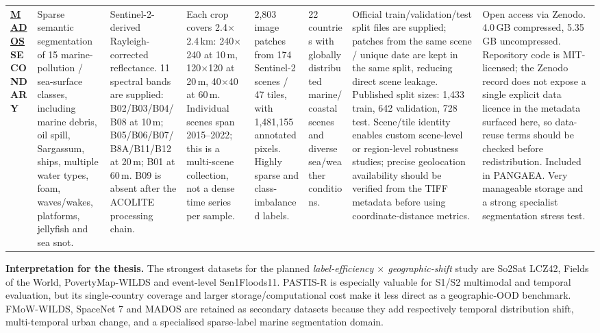 \begin{landscape}
\begin{longtable}{
    Q{1.8cm}
    Q{2.5cm}
    Q{3.0cm}
    Q{2.5cm}
    Q{2.1cm}
    Q{3.0cm}
    Q{3.4cm}
    Q{3.4cm}
}
\href{https://zenodo.org/records/10664073}{\textbf{MADOS}}\newline
\textbf{SECONDARY}
&
Sparse semantic segmentation of 15 marine-pollution / sea-surface classes, including marine debris, oil spill, Sargassum, ships, multiple water types, foam, waves/wakes, platforms, jellyfish and sea snot.
&
Sentinel-2-derived Rayleigh-corrected reflectance. 11 spectral bands are supplied: B02/B03/B04/B08 at 10\,m; B05/B06/B07/B8A/B11/B12 at 20\,m; B01 at 60\,m. B09 is absent after the ACOLITE processing chain.
&
Each crop covers 2.4$\times$2.4\,km: 240$\times$240 at 10\,m, 120$\times$120 at 20\,m, 40$\times$40 at 60\,m. Individual scenes span 2015--2022; this is a multi-scene collection, not a dense time series per sample.
&
2,803 image patches from 174 Sentinel-2 scenes / 47 tiles, with 1,481,155 annotated pixels. Highly sparse and class-imbalanced labels.
&
22 countries with globally distributed marine/coastal scenes and diverse sea/weather conditions.
&
Official train/validation/test split files are supplied; patches from the same scene / unique date are kept in the same split, reducing direct scene leakage. Published split sizes: 1,433 train, 642 validation, 728 test. Scene/tile identity enables custom scene-level or region-level robustness studies; precise geolocation availability should be verified from the TIFF metadata before using coordinate-distance metrics.
&
Open access via Zenodo. 4.0\,GB compressed, 5.35\,GB uncompressed. Repository code is MIT-licensed; the Zenodo record does not expose a single explicit data licence in the metadata surfaced here, so data-reuse terms should be checked before redistribution. Included in PANGAEA. Very manageable storage and a strong specialist segmentation stress test.
\\

\end{longtable}

\vspace{0.5em}
\footnotesize
\noindent\textbf{Interpretation for the thesis.}
The strongest datasets for the planned \emph{label-efficiency $\times$ geographic-shift} study are So2Sat LCZ42, Fields of the World, PovertyMap-WILDS and event-level Sen1Floods11. PASTIS-R is especially valuable for S1/S2 multimodal and temporal evaluation, but its single-country coverage and larger storage/computational cost make it less direct as a geographic-OOD benchmark. FMoW-WILDS, SpaceNet 7 and MADOS are retained as secondary datasets because they add respectively temporal distribution shift, multi-temporal urban change, and a specialised sparse-label marine segmentation domain.


\end{landscape}
